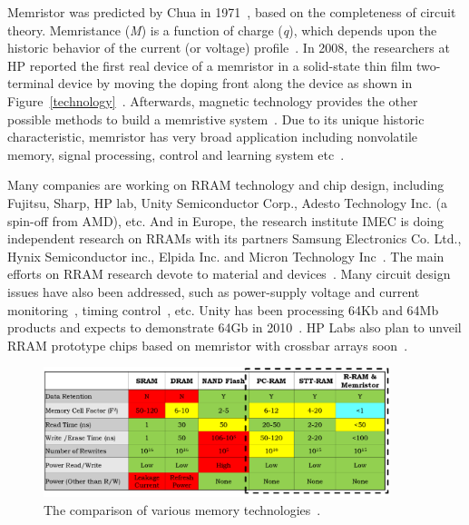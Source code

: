 Memristor was predicted by  Chua in 1971~\cite{Chua71}, based on the completeness of circuit theory. Memristance (\textit{M}) is a function of charge (\textit{q}), which depends upon the historic behavior of the current (or voltage) profile~\cite{Chua76,Strukov08}. In 2008, the researchers at HP reported the first real device of a memristor in a solid-state thin film two-terminal device by moving the doping front along the device as shown in Figure~\ref{technology}~\cite{Tour08}. Afterwards, magnetic technology provides the other possible methods to build a memristive system~\cite{Pershin08,Wang09}. Due to its unique historic characteristic, memristor has very broad application including nonvolatile memory, signal processing, control and learning system etc~\cite{Chen09}.

Many companies are working on RRAM technology and chip design, including Fujitsu, Sharp, HP lab, Unity Semiconductor Corp., Adesto Technology Inc. (a spin-off from AMD), etc. And in Europe, the research institute IMEC is doing independent research on RRAMs with its partners Samsung Electronics Co. Ltd., Hynix Semiconductor inc., Elpida Inc. and Micron Technology Inc~\cite{Johnson10}. The main efforts on RRAM research devote to material and devices~\cite{Fujimoto06,Jung07,Janousch07,Liu00,Hsu07}. Many circuit design issues have also been addressed, such as power-supply voltage and current monitoring~\cite{Balasubramanian09}, timing control~\cite{Kwak09}, etc. Unity has been processing 64Kb and 64Mb products and expects to demonstrate 64Gb in 2010~\cite{LaPedus09}. HP Labs also plan to unveil RRAM prototype chips based on memristor with crossbar arrays soon~\cite{Johnson08}.


\begin{figure}
\centering
\vspace{-10pt}
\includegraphics[width=0.9\textwidth]{./figure/2_table.pdf}
\vspace{-10pt}
\caption{The comparison of various memory technologies~\cite{ITRS07}.}
\label{table}
\vspace{-10pt}
\end{figure}

